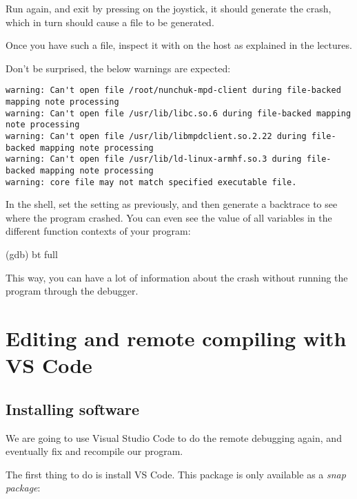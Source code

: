 Run  again, and exit by pressing  on
the joystick, it should generate the crash, which in turn should cause
a  file to be generated.

Once you have such a file, inspect it with 
on the host as explained in the lectures.

Don't be surprised, the below warnings are expected:

{\small
\begin{verbatim}
warning: Can't open file /root/nunchuk-mpd-client during file-backed mapping note processing
warning: Can't open file /usr/lib/libc.so.6 during file-backed mapping note processing
warning: Can't open file /usr/lib/libmpdclient.so.2.22 during file-backed mapping note processing
warning: Can't open file /usr/lib/ld-linux-armhf.so.3 during file-backed mapping note processing
warning: core file may not match specified executable file.
\end{verbatim}
}

In the  shell, set the  setting as previously, and then
generate a backtrace to see where the program crashed.
You can even see the value of all variables in the different
function contexts of your program:

\begin{bashinput}
(gdb) bt full
\end{bashinput}

This way, you can have a lot of information about the crash
without running the program through the debugger.

\section{Editing and remote compiling with VS Code}

\subsection{Installing software}

We are going to use Visual Studio Code to do the remote debugging
again, and eventually fix and recompile our program.

The first thing to do is install VS Code. This package is only available
as a {\em snap package}:



